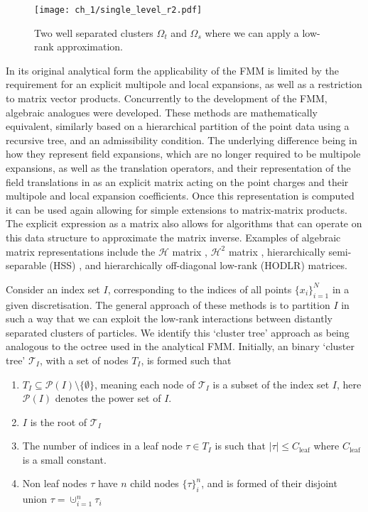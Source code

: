 \begin{figure}
    \centering
    \texttt{[image: ch\_1/single\_level\_r2.pdf]}
    \caption{Two well separated clusters $\Omega_t$ and $\Omega_s$ where we can apply a low-rank approximation.}
    \label{fig:single_level_r2:sec_1_2}
\end{figure}

In its original analytical form the applicability of the FMM is limited by the requirement for an explicit multipole and local expansions, as well as a restriction to matrix vector products. Concurrently to the development of the FMM, algebraic analogues were developed. These methods are mathematically equivalent, similarly based on a hierarchical partition of the point data using a recursive tree, and an admissibility condition. The underlying difference being in how they represent field expansions, which are no longer required to be multipole expansions, as well as the translation operators, and their representation of the field translations in as an explicit matrix acting on the point charges and their multipole and local expansion coefficients. Once this representation is computed it can be used again allowing for simple extensions to matrix-matrix products. The explicit expression as a matrix also allows for algorithms that can operate on this data structure to approximate the matrix inverse. Examples of algebraic matrix representations include the $\mathcal{H}$ matrix \cite{hackbusch1999sparse}, $\mathcal{H}^2$ matrix \cite{borm2003short}, hierarchically semi-separable (HSS) \cite{chandrasekaran2007fast}, and hierarchically off-diagonal low-rank (HODLR) \cite{ambikasaran2013mathcal} matrices. 

Consider an index set $I$, corresponding to the indices of all points $\{ x_i \}_{i=1}^N$ in a given discretisation. The general approach of these methods is to partition $I$ in such a way that we can exploit the low-rank interactions between distantly separated clusters of particles. We identify this `cluster tree' approach as being analogous to the octree used in the analytical FMM. Initially, an binary `cluster tree' $\mathcal{T}_I$, with a set of nodes $T_I$, is formed such that

\begin{enumerate}
    \item $T_I \subseteq \mathcal{P}(I) \setminus \{ \emptyset \}$, meaning each node  of $\mathcal{T}_I$ is a subset of the index set $I$, here $\mathcal{P}(I)$ denotes the power set of $I$.
    \item $I$ is the root of $\mathcal{T}_I$
    \item The number of indices in a leaf node $\tau \in T_I$ is such that $|\tau| \leq C_{\text{leaf}}$ where $C_{\text{leaf}}$ is a small constant.
    \item Non leaf nodes $\tau$ have $n$ child nodes $\{ \tau \}_i^n$, and is formed of their disjoint union $\tau = \cupdot_{i=1}^n \tau_i$ 
\end{enumerate}

